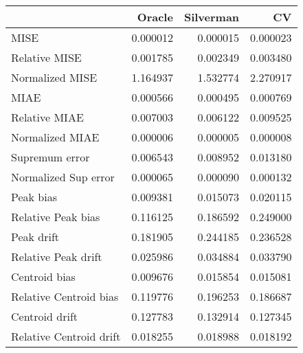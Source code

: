 \begin{tabular}{lrrr}
  \toprule
 & Oracle & Silverman & CV \\ 
  \midrule
MISE & 0.000012 & 0.000015 & 0.000023 \\ 
  Relative MISE & 0.001785 & 0.002349 & 0.003480 \\ 
  Normalized MISE & 1.164937 & 1.532774 & 2.270917 \\ 
  MIAE & 0.000566 & 0.000495 & 0.000769 \\ 
  Relative MIAE & 0.007003 & 0.006122 & 0.009525 \\ 
  Normalized MIAE & 0.000006 & 0.000005 & 0.000008 \\ 
  Supremum error & 0.006543 & 0.008952 & 0.013180 \\ 
  Normalized Sup error & 0.000065 & 0.000090 & 0.000132 \\ 
  Peak bias & 0.009381 & 0.015073 & 0.020115 \\ 
  Relative Peak bias & 0.116125 & 0.186592 & 0.249000 \\ 
  Peak drift & 0.181905 & 0.244185 & 0.236528 \\ 
  Relative Peak drift & 0.025986 & 0.034884 & 0.033790 \\ 
  Centroid bias & 0.009676 & 0.015854 & 0.015081 \\ 
  Relative Centroid bias & 0.119776 & 0.196253 & 0.186687 \\ 
  Centroid drift & 0.127783 & 0.132914 & 0.127345 \\ 
  Relative Centroid drift & 0.018255 & 0.018988 & 0.018192 \\ 
   \bottomrule
\end{tabular}
